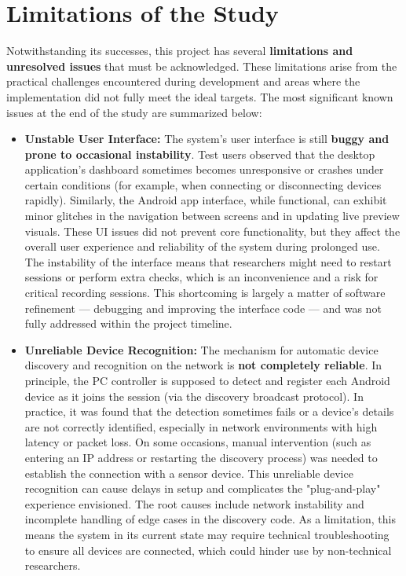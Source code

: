 \section{Limitations of the Study}

Notwithstanding its successes, this project has several \textbf{limitations
and unresolved issues} that must be acknowledged. These limitations
arise from the practical challenges encountered during development and
areas where the implementation did not fully meet the ideal targets. The
most significant known issues at the end of the study are summarized
below:

\begin{itemize}
\item \textbf{Unstable User Interface:} The system's user interface is still
  \textbf{buggy and prone to occasional instability}. Test users observed
  that the desktop application's dashboard sometimes becomes
  unresponsive or crashes under certain conditions (for example, when
  connecting or disconnecting devices rapidly). Similarly, the Android
  app interface, while functional, can exhibit minor glitches in the
  navigation between screens and in updating live preview visuals. These
  UI issues did not prevent core functionality, but they affect the
  overall user experience and reliability of the system during prolonged
  use. The instability of the interface means that researchers might
  need to restart sessions or perform extra checks, which is an
  inconvenience and a risk for critical recording sessions. This
  shortcoming is largely a matter of software refinement --- debugging
  and improving the interface code --- and was not fully addressed within
  the project timeline.

\item \textbf{Unreliable Device Recognition:} The mechanism for automatic device
  discovery and recognition on the network is \textbf{not completely
  reliable}. In principle, the PC controller is supposed to detect and
  register each Android device as it joins the session (via the
  discovery broadcast protocol). In practice, it was found that the
  detection sometimes fails or a device's details are not correctly
  identified, especially in network environments with high latency or
  packet loss. On some occasions, manual intervention (such as entering
  an IP address or restarting the discovery process) was needed to
  establish the connection with a sensor device. This unreliable device
  recognition can cause delays in setup and complicates the
  "plug-and-play" experience envisioned. The root causes include network
  instability and incomplete handling of edge cases in the discovery
  code. As a limitation, this means the system in its current state may
  require technical troubleshooting to ensure all devices are connected,
  which could hinder use by non-technical researchers.


\end{itemize}
